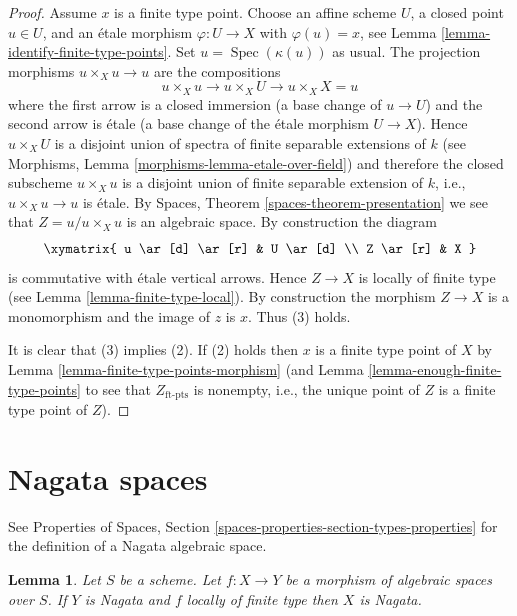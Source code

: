 \documentclass{stacks-project}
\theoremstyle{plain}
\newtheorem{lemma}[subsection]{Lemma}
\theoremstyle{definition}
\theoremstyle{remark}
\numberwithin{equation}{subsection}
\def\Spec{\mathop{\mathrm{Spec}}}
\begin{document}
\begin{proof}
Assume $x$ is a finite type point. Choose an affine scheme $U$,
a closed point $u \in U$, and an \'etale morphism $\varphi : U \to X$
with $\varphi(u) = x$, see
Lemma \ref{lemma-identify-finite-type-points}.
Set $u = \Spec(\kappa(u))$ as usual. The projection morphisms
$u \times_X u \to u$ are the compositions
$$
u \times_X u \to u \times_X U \to u \times_X X = u
$$
where the first arrow is a closed immersion (a base change of
$u \to U$) and the second arrow is \'etale (a base change of the \'etale
morphism $U \to X$). Hence $u \times_X U$ is a disjoint union of spectra
of finite separable extensions of $k$ (see
Morphisms, Lemma \ref{morphisms-lemma-etale-over-field})
and therefore the closed subscheme $u \times_X u$ is a disjoint union of
finite separable extension of $k$, i.e., $u \times_X u \to u$ is \'etale. By
Spaces, Theorem \ref{spaces-theorem-presentation}
we see that $Z = u/u \times_X u$ is an algebraic space. By construction
the diagram
$$
\xymatrix{
u \ar[d] \ar[r] & U \ar[d] \\
Z \ar[r] & X
}
$$
is commutative with \'etale vertical arrows. Hence $Z \to X$ is locally
of finite type (see
Lemma \ref{lemma-finite-type-local}).
By construction the morphism $Z \to X$ is a monomorphism and
the image of $z$ is $x$. Thus (3) holds.

\medskip\noindent
It is clear that (3) implies (2).
If (2) holds then $x$ is a finite type point of $X$ by
Lemma \ref{lemma-finite-type-points-morphism}
(and
Lemma \ref{lemma-enough-finite-type-points}
to see that $Z_{\text{ft-pts}}$ is nonempty, i.e., the unique point of
$Z$ is a finite type point of $Z$).
\end{proof}





\section{Nagata spaces}
\label{section-nagata}

\noindent
See Properties of Spaces, Section
\ref{spaces-properties-section-types-properties} for the definition
of a Nagata algebraic space.

\begin{lemma}
\label{lemma-finite-type-nagata}
Let $S$ be a scheme.
Let $f : X \to Y$ be a morphism of algebraic spaces over $S$.
If $Y$ is Nagata and $f$ locally of finite type then $X$ is Nagata.
\end{lemma}
\end{document}
